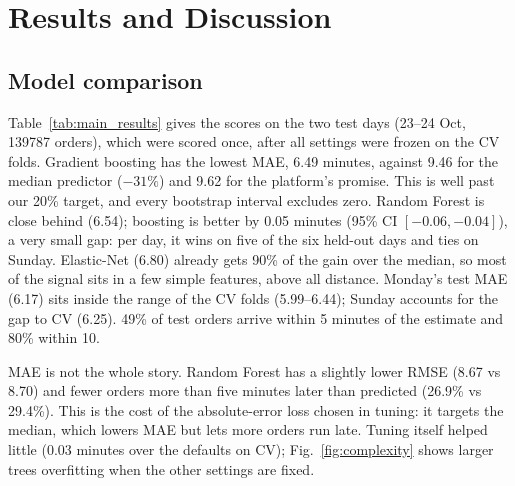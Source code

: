 \section{Results and Discussion}

\subsection{Model comparison}
Table~\ref{tab:main_results} gives the scores on the two test days (23--24 Oct, \num{139787} orders), which
were scored once, after all settings were frozen on the CV folds. Gradient boosting has the lowest MAE,
6.49 minutes, against 9.46 for the median predictor ($-31\%$) and 9.62 for the platform's promise. This is
well past our 20\% target, and every bootstrap interval excludes zero. Random Forest is close behind (6.54);
boosting is better by 0.05 minutes (95\% CI $[-0.06, -0.04]$), a very small gap: per day, it wins on
five of the six held-out days and ties on Sunday. Elastic-Net (6.80) already gets 90\% of the gain over
the median, so most of the signal sits in a few simple features, above all distance. Monday's test MAE
(6.17) sits inside the range of the CV folds (5.99--6.44); Sunday accounts for the gap to CV (6.25). 49\% of test orders arrive within 5 minutes of the estimate
and 80\% within 10.


MAE is not the whole story. Random Forest has a slightly lower RMSE (8.67 vs 8.70) and fewer orders more than
five minutes later than predicted (26.9\% vs 29.4\%). This is the cost of the absolute-error loss chosen in
tuning: it targets the median, which lowers MAE but lets more orders run late. Tuning itself helped little
(0.03 minutes over the defaults on CV); Fig.~\ref{fig:complexity} shows larger trees overfitting when the
other settings are fixed.

